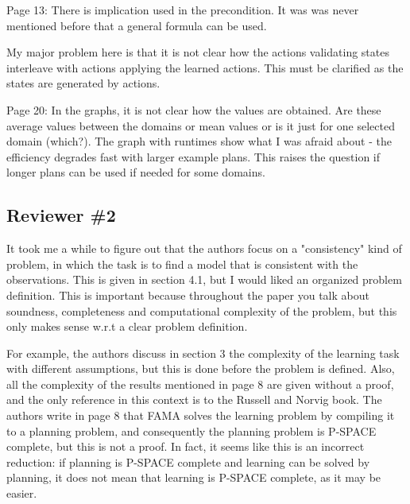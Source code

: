 \documentclass{article}
\begin{document}
\begin{mdframed}[hidealllines=true,backgroundcolor=gray!20]
  Page 13: There is implication used in the precondition. It was was never mentioned before that a general formula can be used.
\end{mdframed}

\begin{mdframed}[hidealllines=true,backgroundcolor=gray!20]
  My major problem here is that it is not clear how the actions validating states interleave with actions applying the learned actions. This must be clarified as the states are generated by actions.
\end{mdframed}

\begin{mdframed}[hidealllines=true,backgroundcolor=gray!20]
  Page 20: In the graphs, it is not clear how the values are obtained. Are these average values between the domains or mean values or is it just for one selected domain (which?).
  The graph with runtimes show what I was afraid about - the efficiency degrades fast with larger example plans. This raises the question if longer plans can be used if needed for some domains.
\end{mdframed}



\subsection*{Reviewer \#2}

\begin{mdframed}[hidealllines=true,backgroundcolor=gray!20]
  It took me a while to figure out that the authors focus on a "consistency" kind of problem, in which the task is to find a model that is consistent with the observations. This is given in section 4.1, but I would liked an organized problem definition. This is important because throughout the paper you talk about soundness, completeness and computational complexity of the problem, but this only makes sense w.r.t a clear problem definition.

For example, the authors discuss in section 3 the complexity of the learning task with different assumptions, but this is done before the problem is defined. Also, all the complexity of the results mentioned in page 8 are given without a proof, and the only reference in this context is to the Russell and Norvig book. The authors write in page 8 that FAMA solves the learning problem by compiling it to a planning problem, and consequently the planning problem is P-SPACE complete, but this is not a proof. In fact, it seems like this is an incorrect reduction: if planning is P-SPACE complete and learning can be solved by planning, it does not mean that learning is P-SPACE complete, as it may be easier.
\end{mdframed}
\end{document}
